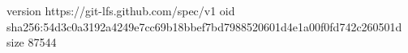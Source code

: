 version https://git-lfs.github.com/spec/v1
oid sha256:54d3c0a3192a4249e7cc69b18bbef7bd7988520601d4e1a00f0fd742c260501d
size 87544
